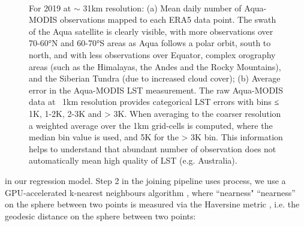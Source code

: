 \documentclass[hess, twostagejnl]{copernicus}
\providecommand{\DIFadd}[1]{{\protect\color{blue} \sf #1}} %
\providecommand{\DIFdel}[1]{{\protect\color{red} \scriptsize #1}} %
\providecommand{\DIFaddbegin}{} %
\providecommand{\DIFaddend}{} %
\providecommand{\DIFdelbegin}{} %
\providecommand{\DIFdelend}{} %
\providecommand{\DIFaddFL}[1]{\DIFadd{#1}} %
\begin{document}
\begin{figure}
	 \\
	\caption{\DIFaddFL{For 2019 at $\sim$ 31km resolution: (a) Mean daily number of Aqua-MODIS observations mapped to each ERA5 data point. The swath of the Aqua satellite is clearly visible, with more observations over 70-60°N and 60-70°S areas as Aqua follows a polar orbit, south to north, and with less observations over Equator, complex orography areas (such as the Himalayas, the Andes and the Rocky Mountains), and the Siberian Tundra (due to increased cloud cover); (b) Average error in the Aqua-MODIS LST measurement. The raw Aqua-MODIS data at ~1km resolution provides categorical LST errors with bins ≤ 1K, 1-2K, 2-3K and > 3K. When averaging to the coarser resolution a weighted average over the 1km grid-cells is computed, where the median bin value is used, and 5K for the > 3K bin. This information helps to understand that abundant number of observation does not automatically mean high quality of LST (e.g. Australia).}} 
	\label{fig:MODIS_time_error_N}
\end{figure}
\noindent \DIFadd{For step (3) }\DIFaddend in \DIFdelbegin \DIFdel{our regression model. Step 2 in }\DIFdelend the joining \DIFdelbegin \DIFdel{pipeline  uses }\DIFdelend \DIFaddbegin \DIFadd{process, we use }\DIFaddend a GPU-accelerated k-nearest neighbours algorithm \cite{Rapids}, where \DIFdelbegin \DIFdel{``nearness" }\DIFdelend \DIFaddbegin \DIFadd{“nearness” on the sphere between two points }\DIFaddend is measured via the Haversine metric\DIFaddbegin \DIFadd{, }\DIFaddend i.e. the geodesic distance \DIFdelbegin \DIFdel{on the sphere between two points:
}%
\end{document}
